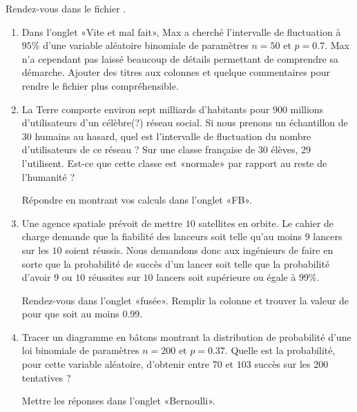 
\begin{exercice}\label{exosmath-0385}

    Rendez-vous dans le fichier .
    \begin{enumerate}
        \item
            Dans l'onglet «Vite et mal fait», Max a cherché l'intervalle de fluctuation à \( 95\%\) d'une variable aléatoire binomiale de paramètres \( n=50\) et \( p=0.7\). Max n'a cependant pas laissé beaucoup de détails permettant de comprendre sa démarche. Ajouter des titres aux colonnes et quelque commentaires pour rendre le fichier plus compréhensible.
        \item
            La Terre comporte environ sept milliards d'habitants pour \( 900\) millions d'utilisateurs d'un célèbre(?) réseau social. Si nous prenons un échantillon de \( 30\) humains au hasard, quel est l'intervalle de fluctuation du nombre d'utilisateurs de ce réseau ? Sur une classe française de \( 30\) élèves, \( 29\) l'utilisent. Est-ce que cette classe est «normale» par rapport au reste de l'humanité ?

            Répondre en montrant vos calculs dans l'onglet «FB».
        \item
            Une agence spatiale prévoit de mettre \( 10\) satellites en orbite. Le cahier de charge demande que la fiabilité des lanceurs soit telle qu'au moins \( 9\) lancers sur les \( 10\) soient réussis. Nous demandons donc aux ingénieurs de faire en sorte que la probabilité de succès d'un lancer soit telle que la probabilité d'avoir \( 9\) ou \( 10\) réussites sur \( 10\) lancers soit supérieure ou égale à \( 99\%\).

            Rendez-vous dans l'onglet «fusée». Remplir la colonne  et trouver la valeur de  pour que  soit au moins \( 0.99\).
        \item
            Tracer un diagramme en bâtons montrant la distribution de probabilité d'une loi binomiale de paramètres \( n=200\) et \( p=0.37\). Quelle est la probabilité, pour cette variable aléatoire, d'obtenir entre \( 70\) et \( 103\) succès sur les \( 200\) tentatives ?

            Mettre les réponses dans l'onglet «Bernoulli».

    \end{enumerate}

\end{exercice}
